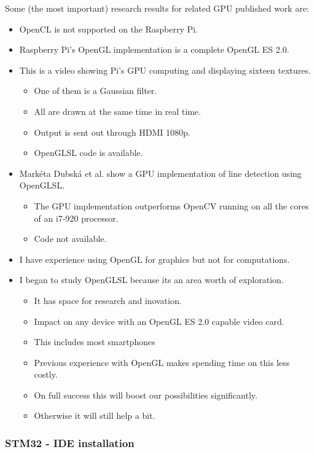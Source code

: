 Some (the most important) research results for related GPU published work are:
\begin{itemize}
	\item OpenCL is not supported on the Raspberry Pi.
	\item Raspberry Pi's OpenGL implementation is a complete OpenGL ES 2.0.
	\item This is a video\cite{cummings} showing Pi’s GPU computing and displaying sixteen textures.
	\begin{itemize}
		\item One of them is a Gaussian filter.
		\item All are drawn at the same time in real time.
		\item Output is sent out through HDMI 1080p.
		\item OpenGLSL code is available.
	\end{itemize}
	\item Markéta Dubská et al.\cite{dubska} show a GPU implementation of line detection using OpenGLSL.
	\begin{itemize}
		\item The GPU implementation outperforms OpenCV running on all the cores of an i7-920 processor.
		\item Code not available.
	\end{itemize}
	\item I have experience using OpenGL for graphics but not for computations.
	\item I began to study OpenGLSL because its an area worth of exploration.
	\begin{itemize}
		\item It has space for research and inovation.
		\item Impact on any device with an OpenGL ES 2.0 capable video card.
		\item This includes most smartphones
		\item Previous experience with OpenGL makes spending time on this less costly.
		\item On full success this will boost our possibilities significantly.
		\item Otherwise it will still help a bit.
	\end{itemize}
\end{itemize}


\subsubsection{STM32 - IDE installation}


